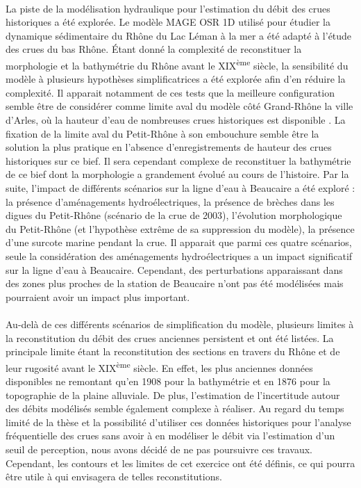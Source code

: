 	\paragraph{} La piste de la modélisation hydraulique pour l'estimation du débit des crues historiques a été explorée. Le modèle MAGE OSR 1D utilisé pour étudier la dynamique sédimentaire du Rhône du Lac Léman à la mer a été adapté à l'étude des crues du bas Rhône. Étant donné la complexité de reconstituer la morphologie et la bathymétrie du Rhône avant le XIX\textsuperscript{ème} siècle, la sensibilité du modèle à plusieurs hypothèses simplificatrices a été explorée afin d'en réduire la complexité. Il apparait notamment de ces tests que la meilleure configuration semble être de considérer comme limite aval du modèle côté Grand-Rhône la ville d'Arles, où la hauteur d'eau de nombreuses crues historiques est disponible \citep{pichard_hauteurs_2013}. La fixation de la limite aval du Petit-Rhône à son embouchure semble être la solution la plus pratique en l'absence d'enregistrements de hauteur des crues historiques sur ce bief. Il sera cependant complexe de reconstituer la bathymétrie de ce bief dont la morphologie a grandement évolué au cours de l'histoire. Par la suite, l'impact de différents scénarios sur la ligne d'eau à Beaucaire a été exploré : la présence d'aménagements hydroélectriques, la présence de brèches dans les digues du Petit-Rhône (scénario de la crue de 2003), l'évolution morphologique du Petit-Rhône (et l'hypothèse extrême de sa suppression du modèle), la présence d'une surcote marine pendant la crue. Il apparait que parmi ces quatre scénarios, seule la considération des aménagements hydroélectriques a un impact significatif sur la ligne d'eau à Beaucaire. Cependant, des perturbations apparaissant dans des zones plus proches de la station de Beaucaire n'ont pas été modélisées mais pourraient avoir un impact plus important.
	
	\paragraph{}	 Au-delà de ces différents scénarios de simplification du modèle, plusieurs limites à la reconstitution du débit des crues anciennes persistent et ont été listées. La principale limite étant la reconstitution des sections en travers du Rhône et de leur rugosité avant le XIX\textsuperscript{ème} siècle. En effet, les plus anciennes données disponibles ne remontant qu'en 1908 pour la bathymétrie et en 1876 pour la topographie de la plaine alluviale. De plus, l'estimation de l'incertitude autour des débits modélisés semble également complexe à réaliser. Au regard du temps limité de la thèse et la possibilité d'utiliser ces données historiques pour l'analyse fréquentielle des crues sans avoir à en modéliser le débit via l'estimation d'un seuil de perception, nous avons décidé de ne pas poursuivre ces travaux. Cependant, les contours et les limites de cet exercice ont été définis, ce qui pourra être utile à qui envisagera de telles reconstitutions. 
	
